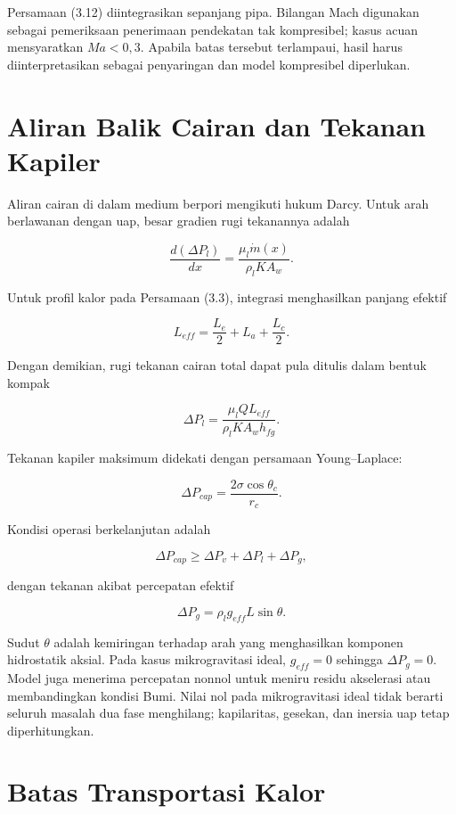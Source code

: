 \documentclass[
  12pt,a4paper,oneside]{report}
\begin{document}
Persamaan (3.12) diintegrasikan sepanjang pipa. Bilangan Mach digunakan
sebagai pemeriksaan penerimaan pendekatan tak kompresibel; kasus acuan
mensyaratkan \(Ma<0{,}3\). Apabila batas tersebut terlampaui, hasil
harus diinterpretasikan sebagai penyaringan dan model kompresibel
diperlukan.

\hypertarget{aliran-balik-cairan-dan-tekanan-kapiler}{%
\section{Aliran Balik Cairan dan Tekanan
Kapiler}\label{aliran-balik-cairan-dan-tekanan-kapiler}}

Aliran cairan di dalam medium berpori mengikuti hukum Darcy. Untuk arah
berlawanan dengan uap, besar gradien rugi tekanannya adalah

\[
\frac{d(\Delta P_l)}{dx}=\frac{\mu_l\dot m(x)}{\rho_l K A_w}.
\tag{3.13}\]

Untuk profil kalor pada Persamaan (3.3), integrasi menghasilkan panjang
efektif

\[
L_{eff}=\frac{L_e}{2}+L_a+\frac{L_c}{2}.
\tag{3.14}\]

Dengan demikian, rugi tekanan cairan total dapat pula ditulis dalam
bentuk kompak

\[
\Delta P_l=\frac{\mu_l Q L_{eff}}{\rho_l K A_w h_{fg}}.
\tag{3.15}\]

Tekanan kapiler maksimum didekati dengan persamaan Young--Laplace:

\[
\Delta P_{cap}=\frac{2\sigma\cos\theta_c}{r_c}.
\tag{3.16}\]

Kondisi operasi berkelanjutan adalah

\[
\Delta P_{cap}\geq \Delta P_v+\Delta P_l+\Delta P_g,
\tag{3.17}\]

dengan tekanan akibat percepatan efektif

\[
\Delta P_g=\rho_l g_{eff}L\sin\theta.
\tag{3.18}\]

Sudut \(\theta\) adalah kemiringan terhadap arah yang menghasilkan
komponen hidrostatik aksial. Pada kasus mikrogravitasi ideal,
\(g_{eff}=0\) sehingga \(\Delta P_g=0\). Model juga menerima percepatan
nonnol untuk meniru residu akselerasi atau membandingkan kondisi Bumi.
Nilai nol pada mikrogravitasi ideal tidak berarti seluruh masalah dua
fase menghilang; kapilaritas, gesekan, dan inersia uap tetap
diperhitungkan.

\hypertarget{batas-transportasi-kalor}{%
\section{Batas Transportasi Kalor}\label{batas-transportasi-kalor}}
\end{document}
